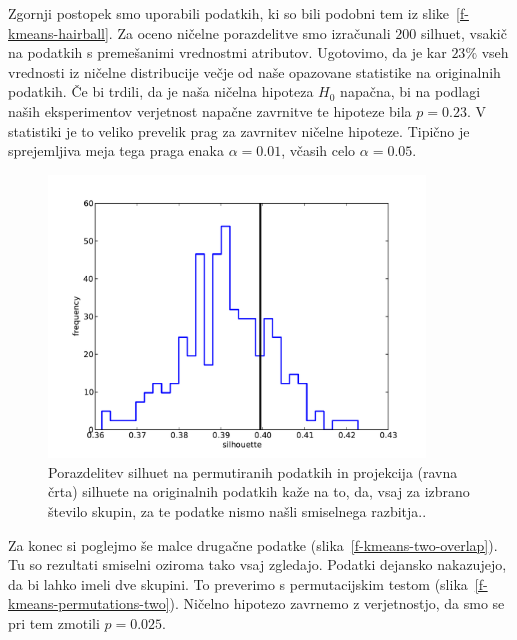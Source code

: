Zgornji postopek smo uporabili podatkih, ki so bili podobni tem iz
slike~\ref{f-kmeans-hairball}. Za oceno ničelne porazdelitve smo
izračunali $200$ silhuet, vsakič na podatkih s premešanimi vrednostmi
atributov. Ugotovimo, da je kar $23\%$ vseh vrednosti iz ničelne
distribucije večje od naše opazovane statistike na originalnih
podatkih. Če bi trdili, da je naša ničelna hipoteza $H_0$ napačna, bi
na podlagi naših eksperimentov verjetnost napačne zavrnitve te
hipoteze bila $p=0.23$. V statistiki je to veliko prevelik prag za
zavrnitev ničelne hipoteze. Tipično je sprejemljiva meja tega praga
enaka $\alpha=0.01$, včasih celo $\alpha=0.05$. 

\begin{figure}[htbp]
\begin{center}
  \includegraphics[width=10cm]{slike/kmeans-permutations.pdf}
\caption{Porazdelitev silhuet na permutiranih podatkih in projekcija
  (ravna črta) silhuete na originalnih podatkih kaže na to, da, vsaj
  za izbrano število skupin, za te podatke nismo našli smiselnega razbitja..}
\label{f-kmeans-permutations}
\end{center}
\end{figure}

Za konec si poglejmo še malce drugačne podatke
(slika~\ref{f-kmeans-two-overlap}). Tu so rezultati smiselni oziroma
tako vsaj zgledajo. Podatki dejansko nakazujejo, da bi lahko imeli
dve skupini. To preverimo s permutacijskim testom
(slika~\ref{f-kmeans-permutations-two}). Ničelno hipotezo zavrnemo z
verjetnostjo, da smo se pri tem zmotili $p=0.025$.

